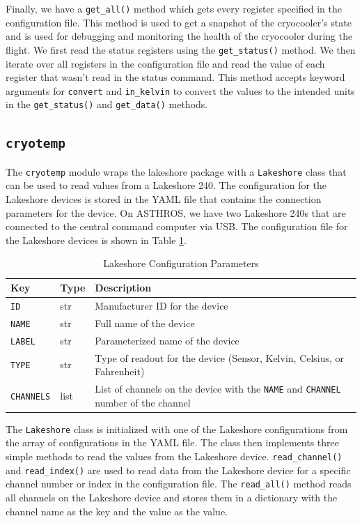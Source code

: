 Finally, we have a \texttt{get\_all()} method which gets every register specified in the configuration file.
This method is used to get a snapshot of the cryocooler's state and is used for debugging and monitoring the health of the cryocooler during the flight. 
We first read the status registers using the \texttt{get\_status()} method.
We then iterate over all registers in the configuration file and read the value of each register
that wasn't read in the status command.
This method accepts keyword arguments for \texttt{convert} and \texttt{in\_kelvin} to convert the values to the intended units in the \texttt{get\_status()} and \texttt{get\_data()} methods.

\subsection{\texttt{cryotemp}}
The \texttt{cryotemp} module wraps the lakeshore package with a \texttt{Lakeshore} class that can be used to read values from a Lakeshore 240. 
The configuration for the Lakeshore devices is stored in the YAML file that contains the connection parameters for the device.
On ASTHROS, we have two Lakeshore 240s that are connected to the central command computer via USB.
The configuration file for the Lakeshore devices is shown in Table \ref{readout/table:lakeshore_config}.

\begin{table}[ht!]
    \centering
    \begin{tabularx}{\textwidth}{l|l|X}
        \textbf{Key} & \textbf{Type} & \textbf{Description} \\ \hline    
        \texttt{ID} & str & Manufacturer ID for the device \\
        \texttt{NAME} & str & Full name of the device \\
        \texttt{LABEL} & str & Parameterized name of the device \\
        \texttt{TYPE} & str & Type of readout for the device (Sensor, Kelvin, Celsius, or Fahrenheit) \\
        \texttt{CHANNELS} & list & List of channels on the device with the \texttt{NAME} and \texttt{CHANNEL} number of the channel
    \end{tabularx}
    \label{readout/table:lakeshore_config}
    \caption{Lakeshore Configuration Parameters}
\end{table}

The \texttt{Lakeshore} class is initialized with one of the Lakeshore configurations from the array of configurations in the YAML file.
The class then implements three simple methods to read the values from the Lakeshore device.
\texttt{read\_channel()} and \texttt{read\_index()} are used to read data from the Lakeshore device for a specific channel number or index in the configuration file.
The \texttt{read\_all()} method reads all channels on the Lakeshore device and stores them in a dictionary with the channel name as the key and the value as the value.


